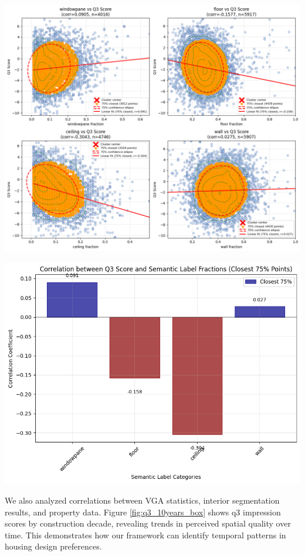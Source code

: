 \documentclass[11pt,a4paper]{article}
\begin{document}
\begin{multicols}{2}
\begin{flushleft}
    \includegraphics[width=0.9\columnwidth]{plots/inter_q3_cluster.png}
    \label{fig:inter_q3_cluster}
\end{flushleft}

\begin{flushleft}
    \includegraphics[width=0.9\columnwidth]{plots/corr_inter_q3.png}
    \label{fig:corr_inter_q3}
\end{flushleft}



We also analyzed correlations between VGA statistics, interior segmentation results, and property data.
Figure \ref{fig:q3_10years_box} shows q3 impression scores by construction decade, revealing trends in 
perceived spatial quality over time. This demonstrates how our framework can identify temporal patterns 
in housing design preferences.


\end{multicols}
\end{document}
